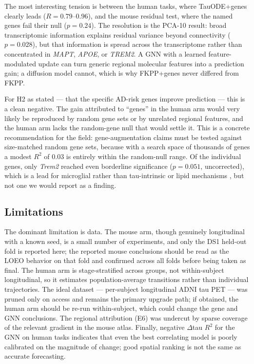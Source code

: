 \documentclass{article}
\begin{document}
The most interesting tension is between the human tasks, where TauODE+genes clearly leads ($R = 0.79$--$0.96$), and the mouse residual test, where the named genes fail their null ($p = 0.24$). The resolution is the PCA-10 result: broad transcriptomic information explains residual variance beyond connectivity ($p = 0.028$), but that information is spread across the transcriptome rather than concentrated in \textit{MAPT}, \textit{APOE}, or \textit{TREM2}. A GNN with a learned feature-modulated update can turn generic regional molecular features into a prediction gain; a diffusion model cannot, which is why FKPP+genes never differed from FKPP.

For H2 as stated --- that the specific AD-risk genes improve prediction --- this is a clean negative. The gain attributed to ``genes'' in the human arm would very likely be reproduced by random gene sets or by unrelated regional features, and the human arm lacks the random-gene null that would settle it. This is a concrete recommendation for the field: gene-augmentation claims must be tested against size-matched random gene sets, because with a search space of thousands of genes a modest $R^2$ of 0.03 is entirely within the random-null range. Of the individual genes, only \textit{Trem2} reached even borderline significance ($p = 0.051$, uncorrected), which is a lead for microglial rather than tau-intrinsic or lipid mechanisms \cite{lee2022}, but not one we would report as a finding.

\subsection{Limitations}

The dominant limitation is data. The mouse arm, though genuinely longitudinal with a known seed, is a small number of experiments, and only the DS1 held-out fold is reported here; the reported mouse conclusions should be read as the LOEO behavior on that fold and confirmed across all folds before being taken as final. The human arm is stage-stratified across groups, not within-subject longitudinal, so it estimates population-average transitions rather than individual trajectories. The ideal dataset --- per-subject longitudinal ADNI tau PET --- was pruned only on access and remains the primary upgrade path; if obtained, the human arm should be re-run within-subject, which could change the gene and GNN conclusions. The regional attribution (E6) was undercut by sparse coverage of the relevant gradient in the mouse atlas. Finally, negative $\Delta$tau $R^2$ for the GNN on human tasks indicates that even the best correlating model is poorly calibrated on the magnitude of change; good spatial ranking is not the same as accurate forecasting.
\end{document}

